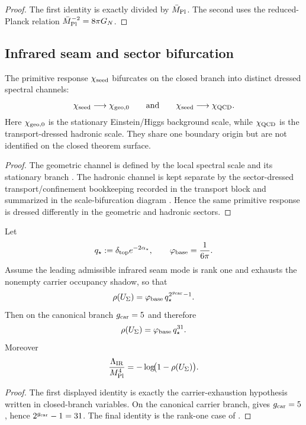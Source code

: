 \begin{proof}
The first identity is exactly  divided by $\bar M_{\mathrm{Pl}}$. The second uses the
reduced-Planck relation $\bar M_{\mathrm{Pl}}^{-2}=8\pi G_N$.
\end{proof}

\subsection{Infrared seam and sector bifurcation}

\begin{theorem}
\label{thm:sector-dressed-spectral-scale-bifurcation}
The primitive response $\chi_{\mathrm{seed}}$ bifurcates on the closed branch into distinct dressed spectral
channels:
\[
\chi_{\mathrm{seed}}\longrightarrow \chi_{\mathrm{geo},0}
\qquad\text{and}\qquad
\chi_{\mathrm{seed}}\longrightarrow \chi_{\mathrm{QCD}}.
\]
Here $\chi_{\mathrm{geo},0}$ is the stationary Einstein/Higgs background scale, while $\chi_{\mathrm{QCD}}$ is the
transport-dressed hadronic scale. They share one boundary origin but are not identified on the
closed theorem surface.
\end{theorem}

\begin{proof}
The geometric channel is defined by the local spectral scale and its stationary branch
. The hadronic channel is
kept separate by the sector-dressed transport/confinement bookkeeping recorded in the transport
block and summarized in the scale-bifurcation diagram . Hence the
same primitive response is dressed differently in the geometric and hadronic sectors.
\end{proof}

\begin{theorem}
\label{thm:carrier-exhausted-ir-seam-eigenvalue}
Let
\[
q_\star:=\delta_{\mathrm{top}} e^{-2\alpha_\star},
\qquad
\varphi_{\mathrm{base}}=\frac{1}{6\pi}.
\]
Assume the leading admissible infrared seam mode is rank one and exhausts the nonempty carrier
occupancy shadow, so that
\[
\rho(U_\Sigma)=\varphi_{\mathrm{base}}\,q_\star^{2^{g_{\mathrm{car}}}-1}.
\]
Then on the canonical branch $g_{\mathrm{car}}=5$ and therefore
\[
\rho(U_\Sigma)=\varphi_{\mathrm{base}}\,q_\star^{31}.
\]
Moreover
\[
\frac{\Lambda_{\mathrm{IR}}}{M_{\mathrm{Pl}}^4}
=
-\log\!\bigl(1-\rho(U_\Sigma)\bigr).
\]
\end{theorem}

\begin{proof}
The first displayed identity is exactly the carrier-exhaustion hypothesis written in closed-branch
variables. On the canonical carrier branch,  gives
$g_{\mathrm{car}}=5$, hence $2^{g_{\mathrm{car}}}-1=31$. The final identity is the rank-one case of
.
\end{proof}

